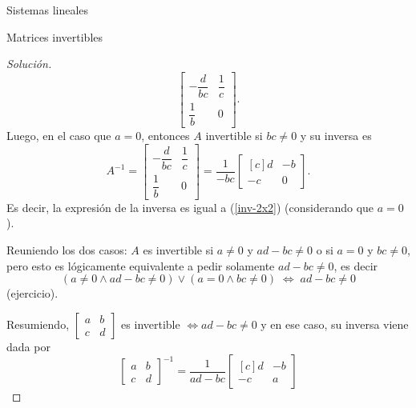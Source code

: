 \documentclass[a4paper,12pt,twoside,spanish,reqno]{amsbook}
\numberwithin{equation}{section}
\theoremstyle{definition}
\theoremstyle{remark}
\begin{document}
\begin{chapter}{Sistemas lineales}
\begin{section}{Matrices invertibles}
\begin{proof}[Solución]
\begin{equation*}
                \begin{bmatrix}-\dfrac{d}{bc}&\dfrac{1}{c}\\[6pt]\dfrac{1}{b}&0\end{bmatrix}.
                \end{equation*}  
                Luego, en el caso  que $a=0$, entonces $A$ invertible si  $b c\not=0$ y su inversa es
                \begin{equation*}
                A^{-1} = \begin{bmatrix}-\dfrac{d}{bc}&\dfrac{1}{c}\\[6pt]\dfrac{1}{b}&0\end{bmatrix} = 
                \dfrac{1}{-bc}
                \begin{bmatrix*}[c]d&-b\\-c&0\end{bmatrix*}.
                \end{equation*}
                Es decir, la expresión de la inversa es igual a (\ref{inv-2x2}) (considerando que  $a=0$).
                
                Reuniendo los dos casos:  $A$ es invertible si $a\not=0$ y  $ad-bc\not=0$ o si $a=0$ y $bc\not=0$, pero esto es lógicamente equivalente a pedir solamente  $ad-bc\not=0$, es decir
                \begin{equation*}
                (a\not=0 \wedge ad-bc\not=0) \vee (a=0 \wedge bc\not=0)\; \Leftrightarrow\; ad-bc\not=0
                \end{equation*}
                (ejercicio).
                
                Resumiendo, $\begin{bmatrix*} a&b\\c&d\end{bmatrix*}$ es invertible  $\Leftrightarrow ad-bc\not=0$  y en ese caso,  su inversa viene dada por 
                \begin{equation}
                \begin{bmatrix*} a&b\\c&d\end{bmatrix*}^{-1} =  \dfrac{1}{ad-bc}
                \begin{bmatrix*}[c]d&-b\\-c&a\end{bmatrix*}
                \end{equation} 
                
                \vskip 6pt
                

\end{proof}
\end{section}
\end{chapter}
\end{document}
